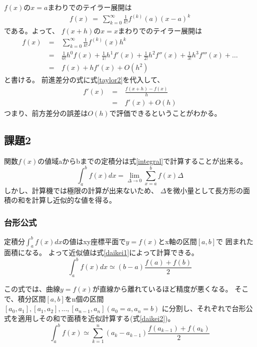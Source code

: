 \documentclass[dvipdfmx]{jsarticle}
\begin{document}
$f(x)$の$x=a$まわりでのテイラー展開は
\begin{eqnarray}
  f(x) ~=~ \sum_{k=0}^{\infty} \frac{1}{k!} f^{(k)}(a)(x-a)^k
  \label{taylor1}
\end{eqnarray}
である。よって、
$f(x+h)$の$x=x$まわりでのテイラー展開は
\begin{eqnarray}
  f(x) ~&=&~ \sum_{k=0}^{\infty} \frac{1}{k!} f^{(k)}(x)h^k \nonumber\\
  &=&~ \frac{1}{0!}h^0f(x) + \frac{1}{1!}h^1f'(x) + \frac{1}{2!}h^2f''(x) + \frac{1}{3!}h^3f'''(x) + \dots \nonumber\\
  &=&~ f(x) + hf'(x) + O(h^2)
  \label{taylor2}
\end{eqnarray}
と書ける。
前進差分の式に式\ref{taylor2}を代入して、
\begin{eqnarray}
  f'(x) ~&=&~ \frac{f(x+h)-f(x)}{h} \nonumber\\
  &=&~ f'(x) + O(h)
  \label{err1}
\end{eqnarray}
つまり、前方差分の誤差は$O(h)$で評価できるということがわかる。

\subsection{課題2}

関数$f(x)$の値域aからbまでの定積分は式\ref{integral}で計算することが出来る。
\begin{equation}
  \int_a^b f(x) dx = \lim_{\Delta \to 0} \sum_{x=a}^{b} f(x) \Delta
  \label{integral}
\end{equation}
しかし、計算機では極限の計算が出来ないため、
$\Delta$を微小量として長方形の面積の和を計算し近似的な値を得る。

\subsubsection{台形公式}
定積分$\int_a^b f(x)dx$の値はxy座標平面で$y=f(x)$とx軸の区間$[a,b]$で
囲まれた面積になる。
よって近似値は式\ref{daikei1}によって計算できる。
\begin{equation}
  \int_a^b f(x)dx \simeq (b-a)\frac{f(a)+f(b)}{2}
  \label{daikei1}
\end{equation}

この式では、曲線$y=f(x)$が直線から離れているほど精度が悪くなる。
そこで、積分区間$[a,b]$をn個の区間$[a_0,a_1],[a_1,a_2],...,[a_{n-1},a_n] (a_0=a,a_n=b)$
に分割し、それぞれで台形公式を適用しその和で面積を近似計算する(式\ref{daikei2})。
\begin{equation}
  \int_a^b f(x) \simeq \sum_{k=1}^{n} (a_k-a_{k-1})\frac{f(a_{k-1})+f(a_k)}{2}
  \label{daikei2}
\end{equation}
\end{document}
